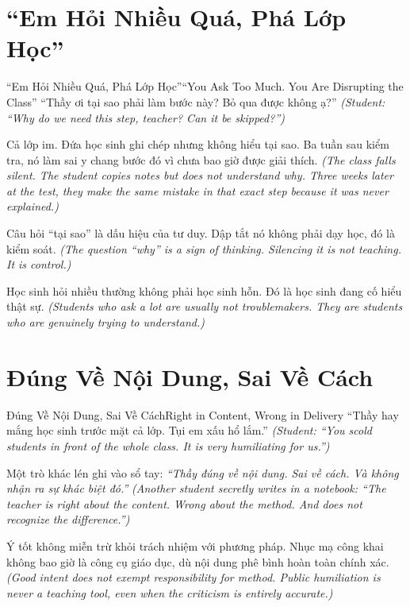 \section{``Em Hỏi Nhiều Quá, Phá Lớp Học''}
\begin{truyen}{``Em Hỏi Nhiều Quá, Phá Lớp Học''}{``You Ask Too Much. You Are Disrupting the Class''}
 ``Thầy ơi tại sao phải làm bước này? Bỏ qua được không ạ?''
\textit{(Student: ``Why do we need this step, teacher? Can it be skipped?'')}


Cả lớp im. Đứa học sinh ghi chép nhưng không hiểu tại sao. Ba tuần sau kiểm tra, nó làm sai y chang bước đó vì chưa bao giờ được giải thích.
\textit{(The class falls silent. The student copies notes but does not understand why. Three weeks later at the test, they make the same mistake in that exact step because it was never explained.)}

\begin{baihoc}
Câu hỏi ``tại sao'' là dấu hiệu của tư duy. Dập tắt nó không phải dạy học, đó là kiểm soát.
\textit{(The question ``why'' is a sign of thinking. Silencing it is not teaching. It is control.)}

Học sinh hỏi nhiều thường không phải học sinh hỗn. Đó là học sinh đang cố hiểu thật sự.
\textit{(Students who ask a lot are usually not troublemakers. They are students who are genuinely trying to understand.)}
\end{baihoc}
\end{truyen}

\section{Đúng Về Nội Dung, Sai Về Cách}
\begin{truyen}{Đúng Về Nội Dung, Sai Về Cách}{Right in Content, Wrong in Delivery}
 ``Thầy hay mắng học sinh trước mặt cả lớp. Tụi em xấu hổ lắm.''
\textit{(Student: ``You scold students in front of the whole class. It is very humiliating for us.'')}


Một trò khác lén ghi vào sổ tay: \textit{``Thầy đúng về nội dung. Sai về cách. Và không nhận ra sự khác biệt đó.''}
\textit{(Another student secretly writes in a notebook: ``The teacher is right about the content. Wrong about the method. And does not recognize the difference.'')}

\begin{baihoc}
Ý tốt không miễn trừ khỏi trách nhiệm với phương pháp. Nhục mạ công khai không bao giờ là công cụ giáo dục, dù nội dung phê bình hoàn toàn chính xác.
\textit{(Good intent does not exempt responsibility for method. Public humiliation is never a teaching tool, even when the criticism is entirely accurate.)}
\end{baihoc}
\end{truyen}

